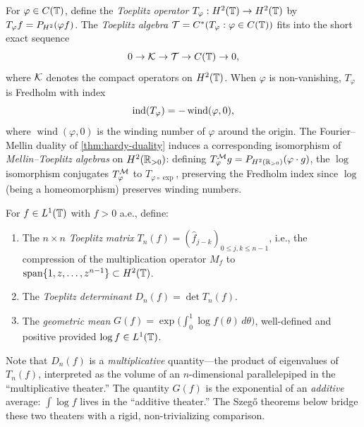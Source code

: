 \begin{remark}
For $\varphi \in C(\mathbb{T})$, define the \emph{Toeplitz operator} $T_\varphi : H^2(\mathbb{T}) \to H^2(\mathbb{T})$ by $T_\varphi f = P_{H^2}(\varphi f)$. The \emph{Toeplitz algebra} $\mathcal{T} = C^*(T_\varphi : \varphi \in C(\mathbb{T}))$ fits into the short exact sequence \cite[Chapter~7]{Douglas}
\[
0 \to \mathcal{K} \to \mathcal{T} \to C(\mathbb{T}) \to 0,
\]
where $\mathcal{K}$ denotes the compact operators on $H^2(\mathbb{T})$. When $\varphi$ is non-vanishing, $T_\varphi$ is Fredholm with index \cite[Chapter~7]{Nikolski}
\[
\operatorname{ind}(T_\varphi) = -\operatorname{wind}(\varphi, 0),
\]
where $\operatorname{wind}(\varphi, 0)$ is the winding number of $\varphi$ around the origin. The Fourier--Mellin duality of \cref{thm:hardy-duality} induces a corresponding isomorphism of \emph{Mellin--Toeplitz algebras} on $H^2(\mathbb{R}_{>0})$: defining $T_\varphi^{\mathcal{M}} g = P_{H^2(\mathbb{R}_{>0})}(\varphi \cdot g)$, the $\log$ isomorphism conjugates $T_\varphi^{\mathcal{M}}$ to $T_{\varphi \circ \exp}$, preserving the Fredholm index since $\log$ (being a homeomorphism) preserves winding numbers.
\end{remark}

\begin{definition}\label{def:toeplitz-det}
For $f \in L^1(\mathbb{T})$ with $f > 0$ a.e., define:
\begin{enumerate}[label=(\alph*)]
\item The $n \times n$ \emph{Toeplitz matrix} $T_n(f) = (\widehat{f}_{j-k})_{0 \leq j,k \leq n-1}$, i.e., the compression of the multiplication operator $M_f$ to $\operatorname{span}\{1, z, \ldots, z^{n-1}\} \subset H^2(\mathbb{T})$.
\item The \emph{Toeplitz determinant} $D_n(f) = \det T_n(f)$.
\item The \emph{geometric mean} $G(f) = \exp\bigl(\int_0^1 \log f(\theta)\, d\theta\bigr)$, well-defined and positive provided $\log f \in L^1(\mathbb{T})$.
\end{enumerate}
Note that $D_n(f)$ is a \emph{multiplicative} quantity---the product of eigenvalues of $T_n(f)$, interpreted as the volume of an $n$-dimensional parallelepiped in the ``multiplicative theater.'' The quantity $G(f)$ is the exponential of an \emph{additive} average: $\int \log f$ lives in the ``additive theater.'' The Szeg\H{o} theorems below bridge these two theaters with a rigid, non-trivializing comparison.
\end{definition}

